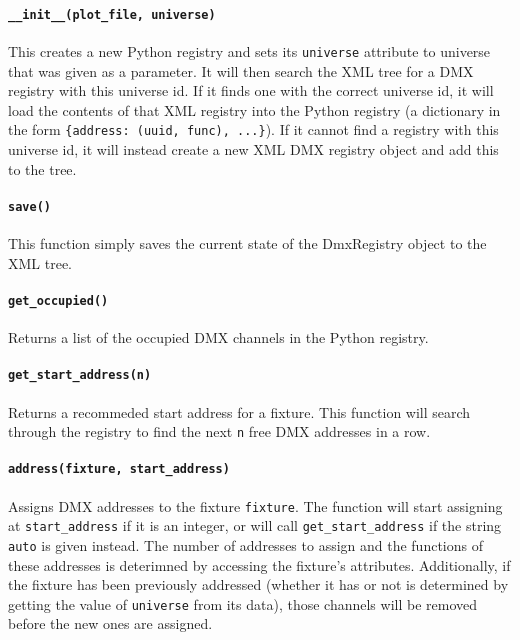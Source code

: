 \documentclass[a4paper]{article}
\begin{document}
\paragraph{\texttt{\_\_init\_\_(plot\_file, universe)}}
This creates a new Python registry and sets its \texttt{universe} attribute 
to universe that was given as a parameter. It will then search the XML tree 
for a DMX registry with this universe id. If it finds one with the correct 
universe id, it will load the contents of that XML registry into the Python 
registry (a dictionary in the form \texttt{\{address: (uuid, func), ...\}}).
If it cannot find a registry with this universe id, it will instead create a 
new XML DMX registry object and add this to the tree.

\paragraph{\texttt{save()}}
This function simply saves the current state of the DmxRegistry object to the 
XML tree. 

\paragraph{\texttt{get\_occupied()}}
Returns a list of the occupied DMX channels in the Python registry.

\paragraph{\texttt{get\_start\_address(n)}}
Returns a recommeded start address for a fixture. This function will search 
through the registry to find the next \texttt{n} free DMX addresses in a row.

\paragraph{\texttt{address(fixture, start\_address)}}
Assigns DMX addresses to the fixture \texttt{fixture}. The function will start 
assigning at \texttt{start\_address} if it is an integer, or will call 
\texttt{get\_start\_address} if the string \texttt{auto} is given instead. 
The number of addresses to assign and the functions of these addresses is 
deterimned by accessing the fixture's attributes. Additionally, if the 
fixture has been previously addressed (whether it has or not is determined by 
getting the value of \texttt{universe} from its data), those channels will be 
removed before the new ones are assigned.
\end{document}

